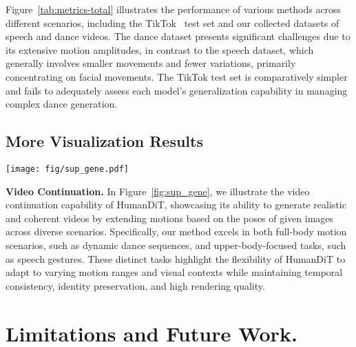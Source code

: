 Figure~\ref{tab:metrics-total} illustrates the performance of various methods across different scenarios, including the TikTok~\cite{jafarian2021learning} test set and our collected datasets of speech and dance videos. The dance dataset presents significant challenges due to its extensive motion amplitudes, in contrast to the speech dataset, which generally involves smaller movements and fewer variations, primarily concentrating on facial movements. The TikTok test set is comparatively simpler and fails to adequately assess each model's generalization capability in managing complex dance generation.

\subsection{More Visualization Results}

\begin{figure*}[htp]
    \centering
    \texttt{[image: fig/sup\_gene.pdf]}
    \vspace{-0.25in}
    \caption{More visualization results of video continuation.}
    \vspace{-0.25in}
    \label{fig:sup_gene}
\end{figure*}


\noindent\textbf{Video Continuation.} In Figure~\ref{fig:sup_gene}, we illustrate the video continuation capability of HumanDiT, showcasing its ability to generate realistic and coherent videos by extending motions based on the poses of given images across diverse scenarios. Specifically, our method excels in both full-body motion scenarios, such as dynamic dance sequences, and upper-body-focused tasks, such as speech gestures. These distinct tasks highlight the flexibility of HumanDiT to adapt to varying motion ranges and visual contexts while maintaining temporal consistency, identity preservation, and high rendering quality. 

\section{Limitations and Future Work.}


